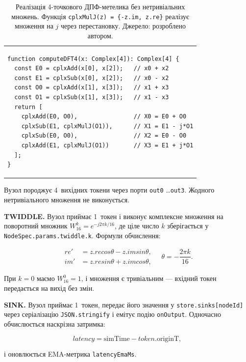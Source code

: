 \begin{longtable}[]{@{}
  >{\raggedright\arraybackslash}p{}@{}}
\caption{Реалізація 4-точкового ДПФ-метелика без нетривіальних множень.
Функція \protect\texttt{cplxMulJ(z)\ =\ \{-z.im,\ z.re\}} реалізує
множення на \(j\) через перестановку. Джерело: розроблено
автором.}\tabularnewline
\toprule\noalign{}
\endfirsthead
\endhead
\bottomrule\noalign{}
\endlastfoot
\begin{minipage}[t]{\linewidth}\raggedright
\begin{verbatim}
function computeDFT4(x: Complex[4]): Complex[4] {
  const E0 = cplxAdd(x[0], x[2]);   // x0 + x2
  const E1 = cplxSub(x[0], x[2]);   // x0 - x2
  const O0 = cplxAdd(x[1], x[3]);   // x1 + x3
  const O1 = cplxSub(x[1], x[3]);   // x1 - x3
  return [
    cplxAdd(E0, O0),                // X0 = E0 + O0
    cplxSub(E1, cplxMulJ(O1)),      // X1 = E1 - j*O1
    cplxSub(E0, O0),                // X2 = E0 - O0
    cplxAdd(E1, cplxMulJ(O1))       // X3 = E1 + j*O1
  ];
}
\end{verbatim}
\end{minipage} \\
\end{longtable}

Вузол породжує 4~вихідних токени через порти \texttt{out0}
\ldots{}\texttt{out3}. Жодного нетривіального множення не виконується.

\textbf{TWIDDLE.} Вузол приймає 1~токен і виконує комплексне множення на
поворотний множник \(W_{16}^{k} = e^{- j2\pi k/16}\), де ціле число
\(k\) зберігається у \texttt{NodeSpec.params.twiddle.k}. Формули
обчислення:

\[\begin{aligned}
{re}' & = z.recos\theta - z.imsin\theta, \\
{im}' & = z.resin\theta + z.imcos\theta,
\end{aligned}\quad\theta = - \frac{2\pi k}{16}.\]

При \(k = 0\) маємо \(W_{16}^{0} = 1\), і множення є тривіальним ---
вхідний токен передається на вихід без змін.

\textbf{SINK.} Вузол приймає 1~токен, передає його значення у
\texttt{store.sinks{[}nodeId{]}} через серіалізацію
\texttt{JSON.stringify} і емітує подію \texttt{onOutput}. Одночасно
обчислюється наскрізна затримка:

\[latency = \text{simTime} - token.\text{originT},\]

і оновлюється EMA-метрика \texttt{latencyEmaMs}.

